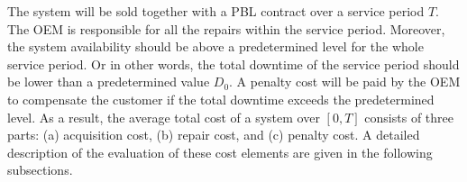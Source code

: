 \documentclass[preprint,12pt]{elsarticle}
\begin{document}
The system will be sold together with a PBL contract over a service period $T$. The OEM is responsible for all the repairs within the service period. Moreover, the system availability should be above a predetermined level for the whole service period. Or in other words, the total downtime of the service period should be lower than a predetermined value $D_0$. A penalty cost will be paid by the OEM to compensate the customer if the total downtime exceeds the predetermined level. As a result, the average total cost of a system over $[0, T]$ consists of three parts: (a) acquisition cost, (b) repair cost, and (c) penalty cost. A detailed description of the evaluation of these cost elements are given in the following subsections.

\end{document}
